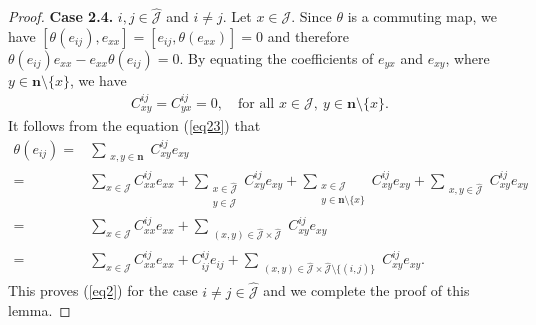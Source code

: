 \documentclass[10pt,a4paper]{amsart}
\begin{document}
\begin{proof}
\textbf{Case 2.4.} $i, j \in \hat{\mathcal{J}}$ and $i \neq j$. Let $x \in \mathcal{J}$. Since $\theta$ is a commuting map, we have $[\theta(e_{ij}), e_{xx}] = [e_{ij}, \theta(e_{xx})] = 0$ and therefore $\theta(e_{ij}) e_{xx} - e_{xx} \theta(e_{ij}) = 0$.
By equating the coefficients of $e_{yx}$ and $e_{xy}$, where $y \in \mathbf{n} \setminus \{x\}$, we have
 \begin{align}\label{eq23}
C_{xy}^{ij} = C_{yx}^{ij} = 0, \quad \text{for all } x \in \mathcal{J},~y \in \mathbf{n} \setminus \{x\}.
\end{align}
It follows from the equation (\ref{eq23}) that
\[
\begin{aligned}
\theta(e_{ij}) =& \sum_{\substack{x,y \in \mathbf{n}}} C_{xy}^{ij} e_{xy} \\
=& \sum_{x \in \mathcal{J}} C_{xx}^{ij} e_{xx} + \sum_{\substack{x \in \hat{\mathcal{J}} \\ y \in \mathcal{J}}} C_{xy}^{ij} e_{xy} + \sum_{\substack{x \in \mathcal{J} \\ y \in \mathbf{n} \setminus \{x\}}} C_{xy}^{ij} e_{xy} + \sum_{\substack{x,y \in \hat{\mathcal{J}}}} C_{xy}^{ij} e_{xy} \\
=& \sum_{x \in \mathcal{J}} C_{xx}^{ij} e_{xx}  + \sum_{\substack{(x,y) \in \hat{\mathcal{J}}\times \hat{\mathcal{J}}}} C_{xy}^{ij} e_{xy}\\
=& \sum_{x \in \mathcal{J}} C_{xx}^{ij} e_{xx} + C_{ij}^{ij} e_{ij} + \sum_{\substack{(x,y) \in \hat{\mathcal{J}}\times \hat{\mathcal{J}}\setminus \{(i,j)\}}} C_{xy}^{ij} e_{xy}.
\end{aligned}
\]
This proves (\ref{eq2}) for the case $i\neq j \in \hat{\mathcal{J}}$ and we complete the proof of this lemma.
\end{proof}
\end{document}
